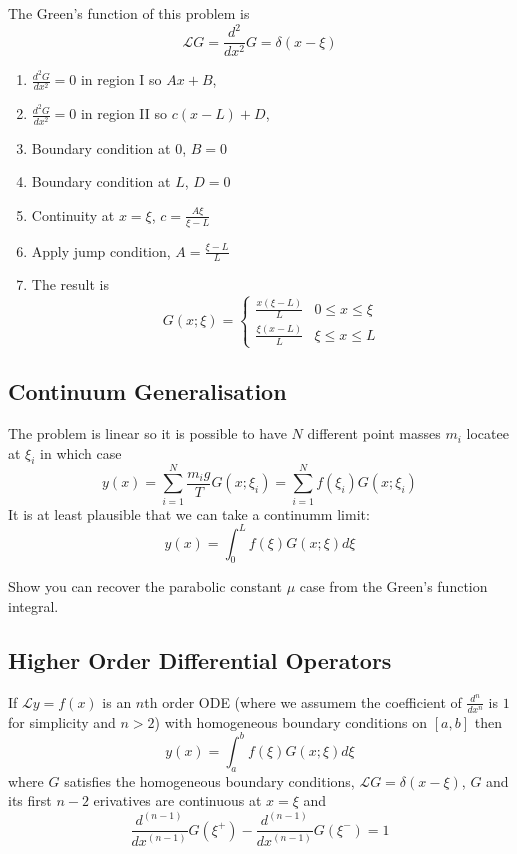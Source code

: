 \documentclass[a4paper]{article}
\renewcommand*{\L}{\mathcal{L}}
\begin{document}
The Green's function of this problem is
\[
  \L G = \frac{d^2}{dx^2} G = \delta(x - \xi)
\]
\begin{enumerate}
\item \(\frac{d^2G}{dx^2} = 0\) in region I so \(A x + B\),
\item \(\frac{d^2G}{dx^2} = 0\) in region II so \(c(x - L) + D\),
\item Boundary condition at \(0\), \(B = 0\) 
\item Boundary condition at \(L\), \(D = 0\) 
\item Continuity at \(x = \xi\), \(c = \frac{A\xi}{\xi - L}\)
\item Apply jump condition, \(A = \frac{\xi -L}{L}\)
\item The result is
  \[
    G(x; \xi) =
    \begin{cases}
      \frac{x(\xi - L)}{L} & 0 \leq x \leq \xi \\
      \frac{\xi(x - L)}{L} & \xi \leq x \leq L
    \end{cases}
  \]
\end{enumerate}

\subsection{Continuum Generalisation}

The problem is linear so it is possible to have \(N\) different point masses \(m_i\) locatee at \(\xi_i\) in which case
\[
  y(x) = \sum_{i = 1}^{N} \frac{m_ig}{T} G(x; \xi_i) = \sum_{i = 1}^{N} f(\xi_i) G(x; \xi_i)
\]
It is at least plausible that we can take a continumm limit:
\[
  y(x) = \int_{0}^{L}  f(\xi) G(x; \xi) d\xi
\]

\begin{ex}
  Show you can recover the parabolic constant \(\mu\) case from the Green's function integral.
\end{ex}

\subsection{Higher Order Differential Operators}

If \(\L y = f(x)\) is an \(n\)th order ODE (where we assumem the coefficient of \(\frac{d^n}{dx^n}\) is \(1\) for simplicity and \(n > 2\)) with homogeneous boundary conditions on \([a, b]\) then
\[
  y(x) = \int_{a}^{b} f(\xi) G(x;\xi) d\xi
\]
where \(G\) satisfies the homogeneous boundary conditions, \(\L G = \delta(x - \xi)\), \(G\) and its first \(n - 2\) erivatives are continuous at \(x = \xi\) and
\[
  \frac{d^{(n - 1)}}{dx^{(n - 1)}} G(\xi^+) - \frac{d^{(n - 1)}}{dx^{(n - 1)}} G(\xi^-) = 1
\]
\end{document}
